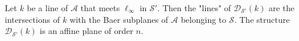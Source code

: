 Let $k$ be a line of $\mathcal{A}$ that meets $\ell_{\infty}$ in $\mathcal{S}'$. Then the "lines" of $\mathcal{D}_{\mathcal{S}'}(k)$ are the intersections of $k$ with the Baer subplanes of $\mathcal{A}$ belonging to $\mathcal{S}$. The structure $\mathcal{D}_{\mathcal{S}'}(k)$ is an affine plane of order $n$.
